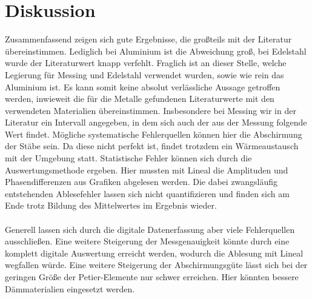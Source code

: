 \section{Diskussion}
Zusammenfassend zeigen sich gute Ergebnisse, die großteils mit der Literatur übereinstimmen. Lediglich bei Aluminium ist die Abweichung groß, bei Edelstahl wurde der Literaturwert
knapp verfehlt. Fraglich ist an dieser Stelle, welche Legierung für Messing und Edelstahl verwendet wurden, sowie wie rein das Aluminium ist. Es kann somit
keine absolut verlässliche Aussage getroffen werden, inwieweit die für die Metalle gefundenen Literaturwerte mit den verwendeten Materialien übereinstimmen. Insbesondere bei Messing
wir in der Literatur ein Intervall angegeben, in dem sich auch der aus der Messung folgende Wert findet.
Mögliche systematische Fehlerquellen können hier die Abschirmung der Stäbe sein. Da diese nicht perfekt ist, findet trotzdem
ein Wärmeaustausch mit der Umgebung statt. Statistische Fehler können sich durch die Auswertungsmethode ergeben. Hier mussten
mit Lineal die Amplituden und Phasendifferenzen aus Grafiken abgelesen werden. Die dabei zwangsläufig entstehenden Ablesefehler lassen sich
nicht quantifizieren und finden sich am Ende trotz Bildung des Mittelwertes im Ergebnis wieder.
\\
\\
Generell lassen sich durch die digitale Datenerfassung aber viele Fehlerquellen ausschließen. Eine weitere Steigerung der Messgenauigkeit könnte
durch eine komplett digitale Auswertung erreicht werden, wodurch die Ablesung mit Lineal wegfallen würde. Eine weitere Steigerung der Abschirmungsgüte
lässt sich bei der geringen Größe der Petier-Elemente nur schwer erreichen. Hier könnten bessere Dämmaterialien eingesetzt werden.

\newpage
\nocite{*}
\printbibliography
